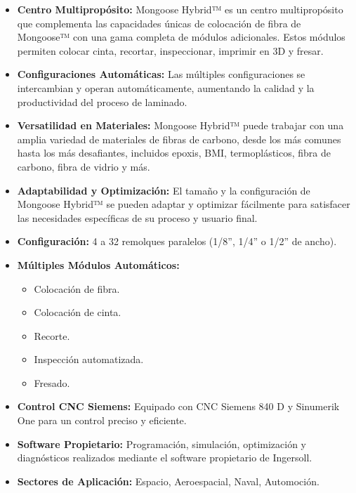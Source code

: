 \begin{enumerate}[label=\arabic*.]
\begin{itemize}
    \item \textbf{Centro Multipropósito:} Mongoose Hybrid™ es un centro multipropósito que complementa las capacidades únicas de colocación de fibra de Mongoose™ con una gama completa de módulos adicionales. Estos módulos permiten colocar cinta, recortar, inspeccionar, imprimir en 3D y fresar.

    \item \textbf{Configuraciones Automáticas:} Las múltiples configuraciones se intercambian y operan automáticamente, aumentando la calidad y la productividad del proceso de laminado.

    \item \textbf{Versatilidad en Materiales:} Mongoose Hybrid™ puede trabajar con una amplia variedad de materiales de fibras de carbono, desde los más comunes hasta los más desafiantes, incluidos epoxis, BMI, termoplásticos, fibra de carbono, fibra de vidrio y más.

    \item \textbf{Adaptabilidad y Optimización:} El tamaño y la configuración de Mongoose Hybrid™ se pueden adaptar y optimizar fácilmente para satisfacer las necesidades específicas de su proceso y usuario final.

    \item \textbf{Configuración:} 4 a 32 remolques paralelos (1/8”, 1/4” o 1/2” de ancho).

    \item \textbf{Múltiples Módulos Automáticos:}
        \begin{itemize}
            \item Colocación de fibra.
            \item Colocación de cinta.
            \item Recorte.
            \item Inspección automatizada.
            \item Fresado.
        \end{itemize}

    \item \textbf{Control CNC Siemens:} Equipado con CNC Siemens 840 D y Sinumerik One para un control preciso y eficiente.

    \item \textbf{Software Propietario:} Programación, simulación, optimización y diagnósticos realizados mediante el software propietario de Ingersoll.

    \item \textbf{Sectores de Aplicación:} Espacio, Aeroespacial, Naval, Automoción.
\end{itemize}


\end{enumerate}
